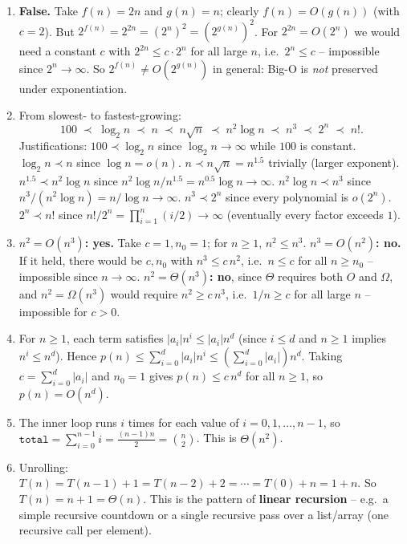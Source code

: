 \documentclass[11pt]{article}
\begin{document}
\begin{enumerate}[label=\textbf{A\arabic*.}, leftmargin=2.2em]
\item \textbf{False.} Take $f(n) = 2n$ and $g(n) = n$; clearly $f(n) = O(g(n))$ (with
$c=2$). But $2^{f(n)} = 2^{2n} = (2^n)^2 = (2^{g(n)})^2$. For $2^{2n} = O(2^n)$ we would
need a constant $c$ with $2^{2n} \le c \cdot 2^n$ for all large $n$, i.e.\ $2^n \le c$ --
impossible since $2^n \to \infty$. So $2^{f(n)} \ne O(2^{g(n)})$ in general: Big-O is
\emph{not} preserved under exponentiation.

\item From slowest- to fastest-growing:
\[
  100 \;\prec\; \log_2 n \;\prec\; n \;\prec\; n\sqrt{n} \;\prec\; n^2 \log n \;\prec\; n^3
  \;\prec\; 2^n \;\prec\; n!.
\]
Justifications: $100 \prec \log_2 n$ since $\log_2 n \to \infty$ while $100$ is constant.
$\log_2 n \prec n$ since $\log n = o(n)$. $n \prec n\sqrt{n} = n^{1.5}$ trivially (larger
exponent). $n^{1.5} \prec n^2 \log n$ since $n^2 \log n / n^{1.5} = n^{0.5}\log n \to
\infty$. $n^2 \log n \prec n^3$ since $n^3 / (n^2 \log n) = n/\log n \to \infty$. $n^3
\prec 2^n$ since every polynomial is $o(2^n)$. $2^n \prec n!$ since $n!/2^n =
\prod_{i=1}^n (i/2) \to \infty$ (eventually every factor exceeds $1$).

\item \textbf{$n^2 = O(n^3)$: yes.} Take $c=1, n_0=1$; for $n \ge 1$, $n^2 \le n^3$.
\textbf{$n^3 = O(n^2)$: no.} If it held, there would be $c, n_0$ with $n^3 \le c\,n^2$,
i.e.\ $n \le c$ for all $n \ge n_0$ -- impossible since $n \to \infty$. \textbf{$n^2 =
\Theta(n^3)$: no}, since $\Theta$ requires both $O$ and $\Omega$, and $n^2 = \Omega(n^3)$
would require $n^2 \ge c\,n^3$, i.e.\ $1/n \ge c$ for all large $n$ -- impossible for
$c>0$.

\item For $n \ge 1$, each term satisfies $|a_i| n^i \le |a_i| n^d$ (since $i \le d$ and $n
\ge 1$ implies $n^i \le n^d$). Hence $p(n) \le \sum_{i=0}^d |a_i| n^i \le \left(
\sum_{i=0}^d |a_i| \right) n^d$. Taking $c = \sum_{i=0}^d |a_i|$ and $n_0 = 1$ gives $p(n)
\le c\,n^d$ for all $n \ge 1$, so $p(n) = O(n^d)$.

\item The inner loop runs $i$ times for each value of $i = 0, 1, \ldots, n-1$, so
$\texttt{total} = \sum_{i=0}^{n-1} i = \frac{(n-1)n}{2} = \binom{n}{2}$. This is
$\Theta(n^2)$.

\item Unrolling: $T(n) = T(n-1)+1 = T(n-2)+2 = \cdots = T(0) + n = 1 + n$. So $T(n) = n+1 =
\Theta(n)$. This is the pattern of \textbf{linear recursion} -- e.g.\ a simple recursive
countdown or a single recursive pass over a list/array (one recursive call per element).


\end{enumerate}
\end{document}
